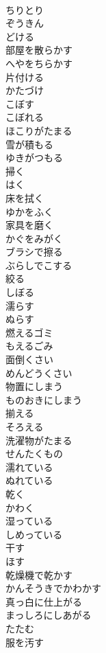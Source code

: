 \documentclass[8pt]{extreport}
\begin{document}
\begin{CJK}{UTF8}{min}
\\	ちりとり	
\\	ぞうきん	
\\	どける	
\\	部屋を散らかす	
\\	へやをちらかす
\\	片付ける	
\\	かたづけ
\\	こぼす	
\\	こぼれる	
\\	ほこりがたまる	
\\	雪が積もる	
\\	ゆきがつもる
\\	掃く	
\\	はく
\\	床を拭く	
\\	ゆかをふく
\\	家具を磨く	
\\	かぐをみがく
\\	ブラシで擦る	
\\	ぶらしでこする
\\	絞る	
\\	しぼる
\\	濡らす	
\\	ぬらす
\\	燃えるゴミ	
\\	もえるごみ
\\	面倒くさい	
\\	めんどうくさい
\\	物置にしまう	
\\	ものおきにしまう
\\	揃える	
\\	そろえる
\\	洗濯物がたまる	
\\	せんたくもの
\\	濡れている	
\\	ぬれている
\\	乾く	
\\	かわく
\\	湿っている	
\\	しめっている
\\	干す	
\\	ほす
\\	乾燥機で乾かす	
\\	かんそうきでかわかす
\\	真っ白に仕上がる	
\\	まっしろにしあがる
\\	たたむ	
\\	服を汚す	

\end{CJK}
\end{document}
